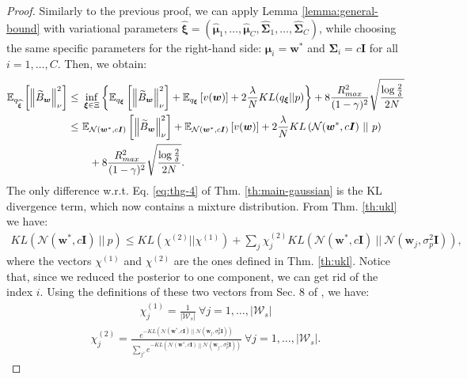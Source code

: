 \documentclass{article}
\newcommand{\wt}[1]{\widetilde{#1}}
\newcommand{\wh}[1]{\widehat{#1}}
\newcommand{\norm}[1]{\left\lVert #1 \right\rVert}
\newcommand{\abs}[1]{\left\lvert #1 \right\rvert}
\begin{document}
\thmg*
\begin{proof}
Similarly to the previous proof, we can apply Lemma \ref{lemma:general-bound} with variational parameters $\wh{\bm{\xi}} = (\wh{\bm{\mu}}_1,\dots,\wh{\bm{\mu}}_C,\wh{\bm{\Sigma}}_1,\dots,\wh{\bm{\Sigma}}_C)$, while choosing the same specific parameters for the right-hand side: $\bm{\mu}_i = \bm{w}^*$ and $\bm{\Sigma}_i = c\bm{I}$ for all $i=1,\dots,C$. Then, we obtain:
\begin{align}\label{eq:thmg-1}
\mathbb{E}_{q_{\wh{\bm{\xi}}}}\left[ \norm{\wt B_{\bm{w}}}_{\nu}^2 \right ] \leq\ & \inf_{\bm{\xi} \in \Xi}\left\{ \mathbb{E}_{q_{\bm{\xi}}}\left[ \norm{\wt B_{\bm{w}}}_{\nu}^2 \right ] + \mathbb{E}_{q_{\bm{\xi}}}\left[ v(\bm{w}) \right] + 2\frac{\lambda}{N} KL({q_{\bm{\xi}}}||p) \right\} + 8\frac{R_{max}^2}{(1-\gamma)^2}\sqrt{\frac{\log\frac{2}{\delta}}{2N}}\notag\\ \leq\ & \mathbb{E}_{\mathcal{N}(\bm{w}^*,c\bm{I})}\left[ \norm{\wt B_{\bm{w}}}_{\nu}^2 \right ] + \mathbb{E}_{\mathcal{N}(\bm{w}^*,c\bm{I})}\left[ v(\bm{w}) \right] + 2\frac{\lambda}{N} KL\left(\mathcal{N}(\bm{w}^*,c\bm{I})\ ||\ p\right)\notag\\ &\ \ + 8\frac{R_{max}^2}{(1-\gamma)^2}\sqrt{\frac{\log\frac{2}{\delta}}{2N}}.
\end{align}
The only difference w.r.t. Eq. \eqref{eq:thg-4} of Thm. \ref{th:main-gaussian} is the KL divergence term, which now contains a mixture distribution. From Thm. \ref{th:ukl} we have:
\begin{align}\label{eq:thmg-2}
KL(\mathcal{N}(\bm{w}^*,c\bm{I})\ ||\ p) \leq KL(\chi^{(2)}||\chi^{(1)}) + \sum_{j} \chi^{(2)}_{j}KL(\mathcal{N}(\bm{w}^*,c\bm{I})\ ||\ \mathcal{N}(\bm{w}_j, \sigma_p^2\bm{I})),
\end{align}
where the vectors $\chi^{(1)}$ and $\chi^{(2)}$ are the ones defined in Thm. \ref{th:ukl}. Notice that, since we reduced the posterior to one component, we can get rid of the index $i$. Using the definitions of these two vectors from Sec. 8 of \cite{hershey2007approximating}, we have:
\begin{align*}
\chi^{(1)}_j = \frac{1}{\abs{\mathcal{W}_s}}\ \forall j = 1,\dots,\abs{\mathcal{W}_s}
\end{align*}
\begin{align}\label{eq:chi2}
\chi^{(2)}_j = \frac{e^{-KL(\mathcal{N}(\bm{w}^*,c\bm{I})\ ||\ \mathcal{N}(\bm{w}_j, \sigma_p^2\bm{I}))}}{\sum_{j'}e^{-KL(\mathcal{N}(\bm{w}^*,c\bm{I})\ ||\ \mathcal{N}(\bm{w}_{j'}, \sigma_p^2\bm{I}))}}\ \forall j = 1,\dots,\abs{\mathcal{W}_s}.

\end{align}
\end{proof}
\end{document}
